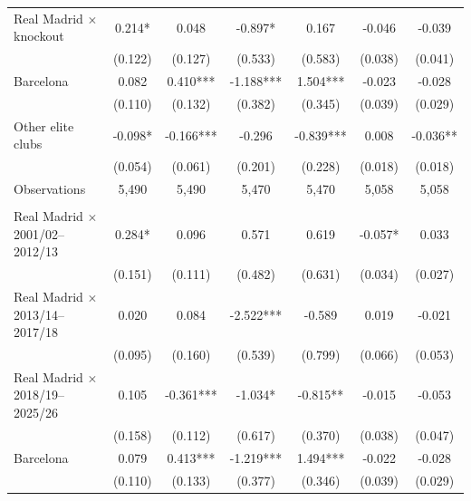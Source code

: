 \begin{table}[!h]
{\begin{threeparttable}
\begin{tabular}[t]{lcccccc}
\hspace{1em}Real Madrid $\times$ knockout & 0.214* & 0.048 & -0.897* & 0.167 & -0.046 & -0.039\\
\hspace{1em} & (0.122) & (0.127) & (0.533) & (0.583) & (0.038) & (0.041)\\
\hspace{1em}Barcelona & 0.082 & 0.410*** & -1.188*** & 1.504*** & -0.023 & -0.028\\
\hspace{1em} & (0.110) & (0.132) & (0.382) & (0.345) & (0.039) & (0.029)\\
\hspace{1em}Other elite clubs & -0.098* & -0.166*** & -0.296 & -0.839*** & 0.008 & -0.036**\\
\hspace{1em} & (0.054) & (0.061) & (0.201) & (0.228) & (0.018) & (0.018)\\
\hspace{1em}Observations & 5,490 & 5,490 & 5,470 & 5,470 & 5,058 & \vphantom{1} 5,058\\
\addlinespace[0.5em]
\multicolumn{7}{l}{\textit{Panel C: By era}}\\
\midrule \hspace{1em}Real Madrid $\times$ 2001/02--2012/13 & 0.284* & 0.096 & 0.571 & 0.619 & -0.057* & 0.033\\
\hspace{1em} & (0.151) & (0.111) & (0.482) & (0.631) & (0.034) & (0.027)\\
\hspace{1em}Real Madrid $\times$ 2013/14--2017/18 & 0.020 & 0.084 & -2.522*** & -0.589 & 0.019 & -0.021\\
\hspace{1em} & (0.095) & (0.160) & (0.539) & (0.799) & (0.066) & (0.053)\\
\hspace{1em}Real Madrid $\times$ 2018/19--2025/26 & 0.105 & -0.361*** & -1.034* & -0.815** & -0.015 & -0.053\\
\hspace{1em} & (0.158) & (0.112) & (0.617) & (0.370) & (0.038) & (0.047)\\
\hspace{1em}Barcelona & 0.079 & 0.413*** & -1.219*** & 1.494*** & -0.022 & -0.028\\
\hspace{1em} & (0.110) & (0.133) & (0.377) & (0.346) & (0.039) & (0.029)\\

\end{tabular}
\end{threeparttable}}
\end{table}
